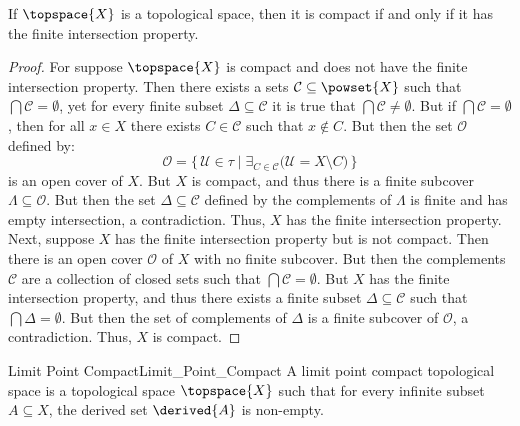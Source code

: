 \documentclass{article}                                                        %
\begin{document}
        \begin{theorem}
            If $\topspace{X}$ is a topological space, then it is compact if and
            only if it has the finite intersection property.
        \end{theorem}
        \begin{proof}
            For suppose $\topspace{X}$ is compact and does not have the finite
            intersection property. Then there exists a sets
            $\mathcal{C}\subseteq\powset{X}$ such that
            $\bigcap\mathcal{C}=\emptyset$, yet for every finite subset
            $\Delta\subseteq\mathcal{C}$ it is true that
            $\bigcap\mathcal{C}\ne\emptyset$. But if
            $\bigcap\mathcal{C}=\emptyset$, then for all $x\in{X}$ there exists
            $C\in\mathcal{C}$ such that $x\notin{C}$. But then the set
            $\mathcal{O}$ defined by:
            \begin{equation}
                \mathcal{O}=\big\{\,\mathcal{U}\in\tau\;|\;
                    \exists_{C\in\mathcal{C}}
                    \big(\mathcal{U}=X\setminus{C}\big)\,\big\}
            \end{equation}
            is an open cover of $X$. But $X$ is compact, and thus there is a
            finite subcover $\Lambda\subseteq\mathcal{O}$. But then the set
            $\Delta\subseteq\mathcal{C}$ defined by the complements of $\Lambda$
            is finite and has empty intersection, a contradiction. Thus,
            $X$ has the finite intersection property. Next, suppose $X$ has the
            finite intersection property but is not compact. Then there is an
            open cover $\mathcal{O}$ of $X$ with no finite subcover. But
            then the complements $\mathcal{C}$ are a collection of closed sets
            such that $\bigcap\mathcal{C}=\emptyset$. But $X$ has the finite
            intersection property, and thus there exists a finite subset
            $\Delta\subseteq\mathcal{C}$ such that $\bigcap\Delta=\emptyset$.
            But then the set of complements of $\Delta$ is a finite subcover
            of $\mathcal{O}$, a contradiction. Thus, $X$ is compact.
        \end{proof}
        \begin{fdefinition}{Limit Point Compact}{Limit_Point_Compact}
            A limit point compact topological space is a topological space
            $\topspace{X}$ such that for every infinite subset $A\subseteq{X}$,
            the derived set $\derived{A}$ is non-empty.
        \end{fdefinition}
\end{document}
